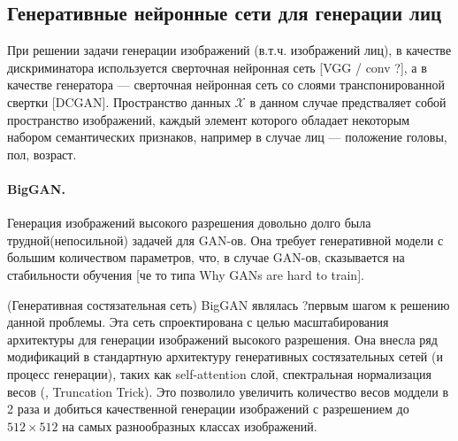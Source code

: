 \subsection{Генеративные нейронные сети для генерации лиц}

При решении задачи генерации изображений (в.т.ч. изображений лиц), в качестве дискриминатора используется сверточная нейронная сеть [VGG / conv ?], а в качестве генератора --- сверточная нейронная сеть со слоями транспонированной свертки [DCGAN].
Пространство данных $\mathcal X$ в данном случае предстваляет собой пространство изображений, каждый элемент которого обладает некоторым набором семантических признаков, например в случае лиц --- положение головы, пол, возраст.


\paragraph{BigGAN.}
Генерация изображений высокого разрешения довольно долго была трудной(непосильной) задачей для GAN-ов. Она требует генеративной модели с большим количеством параметров, что, в случае GAN-ов, сказывается на стабильности обучения [че то типа Why GANs are hard to train].

(Генеративная состязательная сеть) BigGAN \cite{bigGAN} являлась ?первым шагом к решению данной проблемы. Эта сеть спроектирована с целью масштабирования архитектуры для генерации изображений высокого разрешения.
Она внесла ряд модификаций в стандартную архитектуру генеративных состязательных сетей (и процесс генерации), таких как self-attention слой, спектральная нормализация весов (, Truncation Trick). Это позволило увеличить количество весов моддели в 2 раза и добиться качественной генерации изображений с разрешением до $512\times512$ на самых разнообразных классах изображений.


